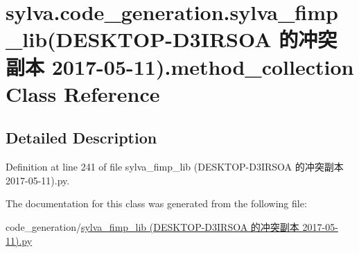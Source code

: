 \hypertarget{classsylva_1_1code__generation_1_1sylva__fimp__lib_07_d_e_s_k_t_o_p-_d3_i_r_s_o_a_01的冲突副ff830aa63ef57fd383d3988edd3ee197}{}\section{sylva.\+code\+\_\+generation.\+sylva\+\_\+fimp\+\_\+lib(D\+E\+S\+K\+T\+O\+P-\/\+D3\+I\+R\+S\+OA 的冲突副本 2017-\/05-\/11).method\+\_\+collection Class Reference}
\label{classsylva_1_1code__generation_1_1sylva__fimp__lib_07_d_e_s_k_t_o_p-_d3_i_r_s_o_a_01的冲突副ff830aa63ef57fd383d3988edd3ee197}


\subsection{Detailed Description}


Definition at line 241 of file sylva\+\_\+fimp\+\_\+lib (\+D\+E\+S\+K\+T\+O\+P-\/\+D3\+I\+R\+S\+O\+A 的冲突副本 2017-\/05-\/11).\+py.



The documentation for this class was generated from the following file\+:\begin{DoxyCompactItemize}
\item 
code\+\_\+generation/\hyperlink{sylva__fimp__lib_01_07_d_e_s_k_t_o_p-_d3_i_r_s_o_a_01的冲突副本_012017-05-11_08_8py}{sylva\+\_\+fimp\+\_\+lib (\+D\+E\+S\+K\+T\+O\+P-\/\+D3\+I\+R\+S\+O\+A 的冲突副本 2017-\/05-\/11).\+py}\end{DoxyCompactItemize}
